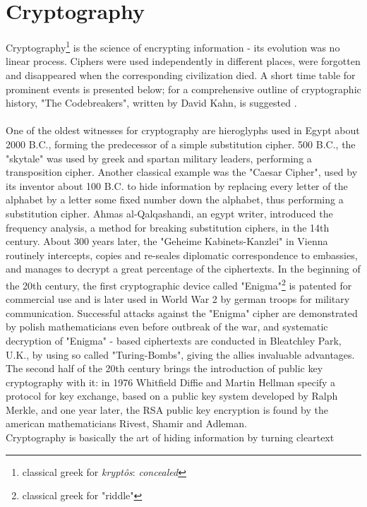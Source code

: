 \section{Cryptography}\label{sec:crypto}
Cryptography\footnote{classical greek for \textit{krypt\^{o}s}: \textit{concealed}}
is the science of encrypting information - its evolution was no linear process. Ciphers were used independently in different
places, were forgotten and disappeared when the corresponding civilization died.
A short time table for prominent events is presented below; for a comprehensive outline of cryptographic history, "The Codebreakers", written by David Kahn,
is suggested \cite{codebreakers}.
\\
\\
One of the oldest witnesses for cryptography are hieroglyphs used in Egypt about 2000 B.C., forming the predecessor
of a simple substitution cipher. 500 B.C., the "skytale" was used by greek and spartan military leaders, performing a transposition cipher. Another classical
example was the "Caesar Cipher", used by its inventor about 100 B.C. to hide information by replacing every letter of the alphabet by a letter some fixed number down the alphabet,
thus performing a substitution cipher. Ahmas al-Qalqashandi, an egypt writer, introduced the frequency analysis, a method for breaking substitution ciphers,
in the 14th century. About 300 years later, the "Geheime Kabinets-Kanzlei" in Vienna routinely intercepts, copies and 
 re-seales diplomatic correspondence to embassies, and manages to decrypt a great percentage of the ciphertexts. In the beginning of the 20th century, the 
 first cryptographic device called "Enigma"\footnote{classical greek for "riddle"} is patented for commercial use and is later used in World War 2 by german troops for 
 military communication. Successful attacks against the "Enigma" cipher are demonstrated by polish mathematicians even before outbreak of the war, and systematic
 decryption of "Enigma" - based ciphertexts are conducted in Bleatchley Park, U.K., by using so called "Turing-Bombs", giving the allies invaluable advantages.
The second half of the 20th century brings the introduction of public key cryptography with it: in 1976 Whitfield Diffie and Martin Hellman specify a 
protocol for key exchange, based on a public key system developed by Ralph Merkle, and one year later, the RSA public key encryption is found by the american
mathematicians Rivest, Shamir and Adleman.
\\
Cryptography is basically the art of hiding information by turning cleartext
